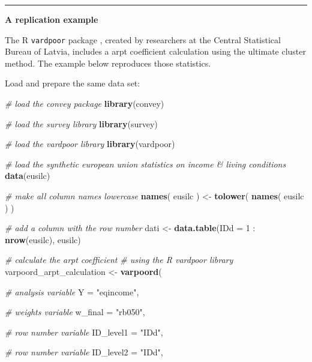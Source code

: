 \documentclass[]{book}
\newenvironment{Shaded}{\begin{snugshade}}{\end{snugshade}}
\newcommand{\KeywordTok}[1]{\textcolor[rgb]{0.13,0.29,0.53}{\textbf{{#1}}}}
\newcommand{\DataTypeTok}[1]{\textcolor[rgb]{0.13,0.29,0.53}{{#1}}}
\newcommand{\DecValTok}[1]{\textcolor[rgb]{0.00,0.00,0.81}{{#1}}}
\newcommand{\StringTok}[1]{\textcolor[rgb]{0.31,0.60,0.02}{{#1}}}
\newcommand{\CommentTok}[1]{\textcolor[rgb]{0.56,0.35,0.01}{\textit{{#1}}}}
\newcommand{\NormalTok}[1]{{#1}}
\begin{document}
\begin{center}\rule{0.5\linewidth}{\linethickness}\end{center}

\textbf{A replication example}

The R \texttt{vardpoor} package \citep{vardpoor}, created by researchers
at the Central Statistical Bureau of Latvia, includes a arpt coefficient
calculation using the ultimate cluster method. The example below
reproduces those statistics.

Load and prepare the same data set:

\begin{Shaded}
\begin{Highlighting}[]
\CommentTok{# load the convey package}
\KeywordTok{library}\NormalTok{(convey)}

\CommentTok{# load the survey library}
\KeywordTok{library}\NormalTok{(survey)}

\CommentTok{# load the vardpoor library}
\KeywordTok{library}\NormalTok{(vardpoor)}

\CommentTok{# load the synthetic european union statistics on income & living conditions}
\KeywordTok{data}\NormalTok{(eusilc)}

\CommentTok{# make all column names lowercase}
\KeywordTok{names}\NormalTok{( eusilc ) <-}\StringTok{ }\KeywordTok{tolower}\NormalTok{( }\KeywordTok{names}\NormalTok{( eusilc ) )}

\CommentTok{# add a column with the row number}
\NormalTok{dati <-}\StringTok{ }\KeywordTok{data.table}\NormalTok{(}\DataTypeTok{IDd =} \DecValTok{1} \NormalTok{:}\StringTok{ }\KeywordTok{nrow}\NormalTok{(eusilc), eusilc)}

\CommentTok{# calculate the arpt coefficient}
\CommentTok{# using the R vardpoor library}
\NormalTok{varpoord_arpt_calculation <-}
\StringTok{    }\KeywordTok{varpoord}\NormalTok{(}
    
        \CommentTok{# analysis variable}
        \DataTypeTok{Y =} \StringTok{"eqincome"}\NormalTok{, }
        
        \CommentTok{# weights variable}
        \DataTypeTok{w_final =} \StringTok{"rb050"}\NormalTok{,}
        
        \CommentTok{# row number variable}
        \DataTypeTok{ID_level1 =} \StringTok{"IDd"}\NormalTok{,}
        
        \CommentTok{# row number variable}
        \DataTypeTok{ID_level2 =} \StringTok{"IDd"}\NormalTok{,}
        

\end{Highlighting}
\end{Shaded}
\end{document}
